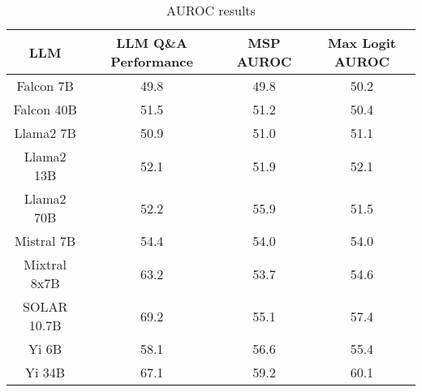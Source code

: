 \renewcommand\arraystretch{1.2}
\begin{table*}
\centering
\begin{tabular}{c|c|c|c}
LLM & LLM Q\&A Performance & MSP AUROC & Max Logit AUROC\\ \hline
Falcon 7B & 49.8 & 49.8 & 50.2\\
Falcon 40B & 51.5 & 51.2 & 50.4\\
Llama2 7B & 50.9 & 51.0 & 51.1\\
Llama2 13B & 52.1 & 51.9 & 52.1\\
Llama2 70B & 52.2 & 55.9 & 51.5\\
Mistral 7B & 54.4 & 54.0 & 54.0\\
Mixtral 8x7B & 63.2 & 53.7 & 54.6\\
SOLAR 10.7B & 69.2 & 55.1 & 57.4\\
Yi 6B & 58.1 & 56.6 & 55.4\\
Yi 34B & 67.1 & 59.2 & 60.1\\
\hline
\end{tabular}
\caption{AUROC results}
\end{table*}
\label{tab:auroc}
